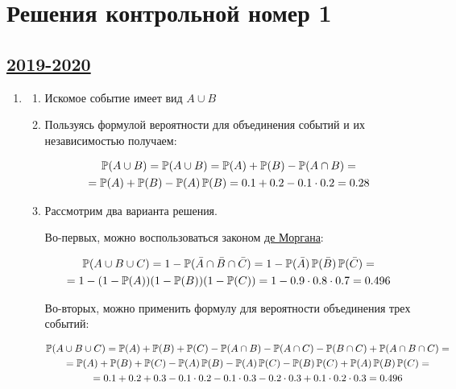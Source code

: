 
\thispagestyle{empty}
\section{Решения контрольной номер 1}


\subsection[2019-2020]{\hyperref[sec:kr_01_2019_2020]{2019-2020}}
\label{sec:sol_kr_01_2019_2020}

\begin{enumerate}
	
	\item  
	\begin{enumerate}
	\item Искомое событие имеет вид $A\cup B$
	\item Пользуясь формулой вероятности для объединения событий и их независимостью получаем:
	
	\begin{multline*}
	\P(A\cup B)=\P(A\cup B)=\P(A)+\P(B)-\P(A\cap B)=\\
	=\P(A)+\P(B)-\P(A)\P(B)=0.1+0.2-0.1\cdot 0.2=0.28
	\end{multline*}
	\item Рассмотрим два варианта решения.
	
	Во-первых, можно воспользоваться законом \href{https://en.wikipedia.org/wiki/Augustus_De_Morgan}{де Моргана}:
	
	\begin{multline*}
	\P(A\cup B\cup C)=1-\P(\bar{A}\cap \bar{B}\cap \bar{C})=1-\P(\bar{A})\P(\bar{B})\P(\bar{C})= \\
	=1-(1-\P(A))(1-\P(B))(1-\P(C))=1-0.9\cdot 0.8 \cdot 0.7=0.496
	\end{multline*}
	
	Во-вторых, можно применить формулу для вероятности объединения трех событий:
	
	\begin{multline*}
	\P(A\cup B\cup C)=\P(A)+\P(B)+\P(C)-\P(A\cap B)-\P(A\cap C)-\P(B\cap C)+\P(A\cap B\cap C)=\\
	=\P(A)+\P(B)+\P(C)-\P(A)\P(B)-\P(A)\P(C)-\P(B)\P(C)+\P(A)\P(B)\P(C)=\\
	=0.1+0.2+0.3-0.1\cdot 0.2-0.1\cdot 0.3-0.2\cdot 0.3+0.1\cdot 0.2\cdot 0.3=0.496
	\end{multline*}
	

\end{enumerate}
\end{enumerate}
